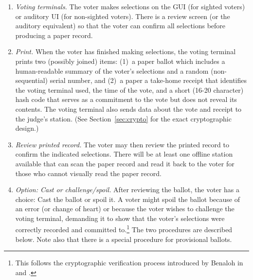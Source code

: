 \begin{enumerate}
\item {\em Voting terminals.}
 The voter makes selections on the GUI (for sighted voters)
 or auditory UI (for non-sighted voters).
 There is a review screen (or the auditory equivalent)
 so that the voter can confirm all selections before producing a paper record.

\item {\em Print.} When the voter has finished making selections,
  the voting terminal prints two (possibly joined) items:
  (1)~a paper ballot which includes a human-readable summary of the voter's selections
  and a random (non-sequential) serial number, and
  (2)~a paper a take-home receipt that identifies the voting terminal used, the
  time of the vote, and a short (16-20 character) hash code that
  serves as a commitment to the vote but does not reveal its contents.
  The voting terminal also sends data about the vote and receipt
  to the judge's station. (See Section~\ref{sec:crypto} for the exact
  cryptographic design.)


 
% 

\item {\em Review printed record.}
The voter may then review the printed record to confirm the indicated
selections. 
There will be at least one offline station available that can 
scan the paper record and read it back to the 
voter for those who cannot visually read the paper record.

\item {\em Option: Cast or challenge/spoil.}
After reviewing the ballot, the voter has a choice: Cast the ballot or spoil it.
 A voter might spoil the ballot because of an error (or change of heart)
 or because the voter wishes to challenge the voting terminal, demanding it to show
 that the voter's selections were correctly recorded and committed to.\footnote{%
 This follows the cryptographic verification process introduced by Benaloh
 in \cite{benaloh06simple} and \cite{benaloh07evt}.
 }
 The two procedures are described below. 
 Note also that there is a special procedure for provisional ballots.


\end{enumerate}
